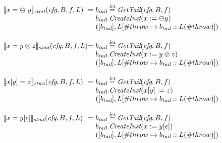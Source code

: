\[\begin{array}{l@{}l@{~}l}
\transfun{\irunop{x}{y}}_{\emph{stmt}}(\emph{cfg}, B, f, L) & = &
b_{\emph{tail}} \letval \GetTail(\emph{cfg}, B, f)\\
& & b_{\emph{tail}}.\emph{CreateInst}(x := \preop y)\\
& & ([b_{\emph{tail}}], L[\#throw \mapsto b_{\emph{tail}}::L(\#throw)])\\
& & \\

\transfun{\irbiop{x}{y}{z}}_{\emph{stmt}}(\emph{cfg}, B, f, L) & = &
b_{\emph{tail}} \letval \GetTail(\emph{cfg}, B, f)\\
& & b_{\emph{tail}}.\emph{CreateInst}(x := y \inop z)\\
& & ([b_{\emph{tail}}],L[\#throw \mapsto b_{\emph{tail}}::L(\#throw)])\\
& & \\

\transfun{\irstore{x}{y}{z}}_{\emph{stmt}}(\emph{cfg}, B, f, L) & = &
b_{\emph{tail}} \letval \GetTail(\emph{cfg}, B, f)\\
& & b_{\emph{tail}}.\emph{CreateInst}(x[y] := z)\\
& & ([b_{\emph{tail}}], L[\#throw \mapsto b_{\emph{tail}}::L(\#throw)])\\
& & \\

\transfun{\irload{x}{y}{e}}_{\emph{stmt}}(\emph{cfg}, B, f, L) & = &
b_{\emph{tail}} \letval \GetTail(\emph{cfg}, B, f)\\
& & b_{\emph{tail}}.\emph{CreateInst}(x := y[e])\\
& & ([b_{\emph{tail}}],L[\#throw \mapsto b_{\emph{tail}}::L(\#throw)])\\
& & \\


\end{array}\]
